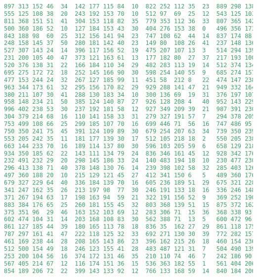 \begin{lstlisting}[language=python]
897	313	152	46	34	142	177	115	84	10	822	252	112	35	23	889	298	138	45	29
555	125	108	38	20	243	192	153	70	10	512	97	69	25	12	543	125	103	38	16
811	368	151	51	41	304	153	118	82	35	779	353	112	36	33	807	365	142	40	35
500	360	186	52	10	127	184	153	43	30	404	276	153	38	0	496	356	173	45	9
843	188	98	60	25	312	156	141	94	23	747	108	62	44	14	837	174	88	59	23
248	158	145	37	50	280	181	142	40	23	149	80	108	26	41	237	148	136	31	39
527	307	143	24	14	396	117	156	52	19	475	207	107	13	3	514	294	139	13	1
231	200	105	40	47	373	121	163	61	13	177	182	80	27	37	217	193	100	31	42
520	376	138	31	22	166	184	110	34	29	482	283	113	19	14	512	374	134	28	16
695	275	172	72	18	252	145	166	90	30	598	254	140	55	9	685	274	157	69	4
477	153	244	24	32	267	127	185	99	11	451	58	212	8	22	474	147	238	21	32
963	344	173	61	32	295	156	170	82	29	929	288	141	47	21	949	332	164	50	19
380	211	107	30	41	288	130	183	34	10	300	136	69	19	31	376	197	107	27	29
958	148	234	21	50	385	124	140	87	27	926	128	208	4	40	952	143	229	15	43
996	402	238	53	30	237	192	181	58	12	927	349	209	39	21	987	391	230	50	30
304	379	214	68	16	110	141	158	33	31	279	327	191	57	7	294	378	205	61	10
753	499	108	66	25	299	185	107	70	16	699	446	71	56	16	747	486	95	56	10
750	350	241	75	45	391	124	109	89	30	679	254	207	63	34	739	350	239	69	42
553	205	242	35	11	181	177	139	30	17	512	105	218	18	2	550	205	238	26	5
663	144	233	70	16	189	114	137	80	30	596	103	205	59	6	658	129	218	56	11
934	350	185	62	22	143	111	134	79	24	836	346	161	45	12	928	342	176	61	16
232	491	232	29	20	298	145	186	33	24	140	483	194	18	10	230	477	230	15	12
296	413	138	71	40	378	148	130	76	14	239	398	102	58	32	285	403	126	68	32
497	360	188	20	10	215	129	121	45	27	412	341	150	6	5	489	360	176	11	3
679	327	229	64	40	336	184	139	70	16	605	236	189	51	29	675	321	228	61	35
341	247	162	35	26	213	197	98	77	30	246	191	133	18	16	336	246	148	33	22
371	267	194	63	17	198	163	94	59	21	322	191	156	52	9	369	252	190	48	14
883	384	176	65	25	260	181	155	45	32	803	368	139	51	15	875	372	162	65	11
375	351	96	29	46	163	152	103	69	12	283	306	71	15	36	368	338	93	16	44
602	474	104	31	14	203	168	108	83	30	562	388	71	13	5	600	472	96	17	10
861	127	185	44	39	180	165	113	78	18	836	35	162	27	29	861	118	175	43	39
787	297	161	41	47	222	118	125	32	33	692	271	130	30	39	772	282	157	38	39
461	169	238	44	28	208	165	143	86	23	396	162	215	26	18	460	154	236	32	15
512	500	154	49	18	246	123	155	41	28	483	487	121	31	7	504	490	139	43	5
253	200	104	56	16	374	172	131	46	35	210	110	74	46	7	242	186	90	42	12
567	405	214	67	12	116	174	151	36	15	536	363	182	55	1	561	404	206	53	1
854	189	206	72	22	399	143	133	92	12	766	133	168	59	14	840	184	206	66	15

\end{lstlisting}
